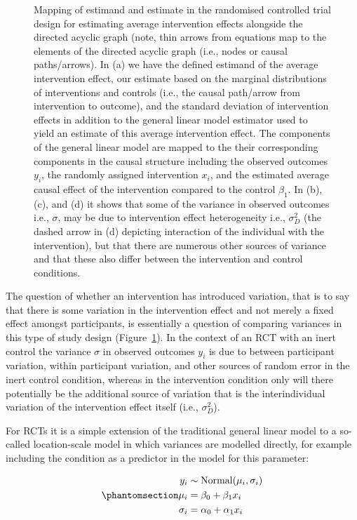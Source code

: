 \documentclass[
]{article}
\begin{document}
\begin{figure}
\caption{\label{fig-rct-variance}Mapping of estimand and estimate in the
randomised controlled trial design for estimating average intervention
effects alongside the directed acyclic graph (note, thin arrows from
equations map to the elements of the directed acyclic graph (i.e., nodes
or causal paths/arrows). In (a) we have the defined estimand of the
average intervention effect, our estimate based on the marginal
distributions of interventions and controls (i.e., the causal path/arrow
from intervention to outcome), and the standard deviation of
intervention effects in addition to the general linear model estimator
used to yield an estimate of this average intervention effect. The
components of the general linear model are mapped to the their
corresponding components in the causal structure including the observed
outcomes \(y_i\), the randomly assigned intervention \(x_i\), and the
estimated average causal effect of the intervention compared to the
control \(\beta_1\). In (b), (c), and (d) it shows that some of the
variance in observed outcomes i.e., \(\sigma\), may be due to
intervention effect heterogeneity i.e., \(\sigma_{D}^2\) (the dashed
arrow in (d) depicting interaction of the individual with the
intervention), but that there are numerous other sources of variance and
that these also differ between the intervention and control conditions.}

\end{figure}%

The question of whether an intervention has introduced variation, that
is to say that there is some variation in the intervention effect and
not merely a fixed effect amongst participants, is essentially a
question of comparing variances in this type of study design
(Figure~\ref{fig-rct-variance}). In the context of an RCT with an inert
control the variance \(\sigma\) in observed outcomes \(y_i\) is due to
between participant variation, within participant variation, and other
sources of random error in the inert control condition, whereas in the
intervention condition only will there potentially be the additional
source of variation that is the interindividual variation of the
intervention effect itself (i.e., \(\sigma_{D}^2\)).

For RCTs it is a simple extension of the traditional general linear
model to a so-called location-scale model in which variances are
modelled directly, for example including the condition as a predictor in
the model for this parameter:

\begin{equation}\protect\phantomsection\label{eq-location-scale}{
\begin{aligned}
y_i &\sim \text{Normal}(\mu_i, \sigma_i) \\
\mu_i &= \beta_0 + \beta_1 x_i \\
\sigma_i &= \alpha_0 + \alpha_1 x_i
\end{aligned}
}\end{equation}
\end{document}
